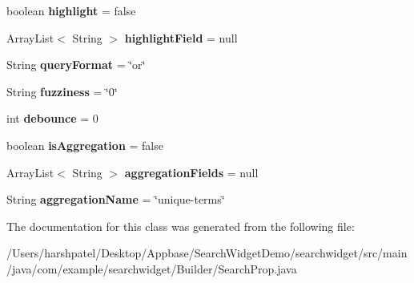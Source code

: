 \begin{DoxyCompactItemize}
boolean {\bfseries highlight} = false
\item 
\mbox{\label{classcom_1_1example_1_1searchwidget_1_1_builder_1_1_search_prop_a4ef4c4d48ffb32bfcd80ac8875bc25b3}} 
Array\+List$<$ String $>$ {\bfseries highlight\+Field} = null
\item 
\mbox{\label{classcom_1_1example_1_1searchwidget_1_1_builder_1_1_search_prop_a1c30b0c77aa609f899093a9158eda628}} 
String {\bfseries query\+Format} = \char`\"{}or\char`\"{}
\item 
\mbox{\label{classcom_1_1example_1_1searchwidget_1_1_builder_1_1_search_prop_a78152e6165d519e2585e454ab26515ad}} 
String {\bfseries fuzziness} = \char`\"{}0\char`\"{}
\item 
\mbox{\label{classcom_1_1example_1_1searchwidget_1_1_builder_1_1_search_prop_a0f8797348b278e12000d547e5093a48f}} 
int {\bfseries debounce} = 0
\item 
\mbox{\label{classcom_1_1example_1_1searchwidget_1_1_builder_1_1_search_prop_a7fc9001937e2d719d07d0459c04ed6f7}} 
boolean {\bfseries is\+Aggregation} = false
\item 
\mbox{\label{classcom_1_1example_1_1searchwidget_1_1_builder_1_1_search_prop_a1cd7de2fa2c5af4998fe6dbd695f09dc}} 
Array\+List$<$ String $>$ {\bfseries aggregation\+Fields} = null
\item 
\mbox{\label{classcom_1_1example_1_1searchwidget_1_1_builder_1_1_search_prop_ac4fb4827111099d030442dabb1ac8579}} 
String {\bfseries aggregation\+Name} = \char`\"{}unique-\/terms\char`\"{}
\end{DoxyCompactItemize}


The documentation for this class was generated from the following file\+:\begin{DoxyCompactItemize}
\item 
/\+Users/harshpatel/\+Desktop/\+Appbase/\+Search\+Widget\+Demo/searchwidget/src/main/java/com/example/searchwidget/\+Builder/Search\+Prop.\+java\end{DoxyCompactItemize}
